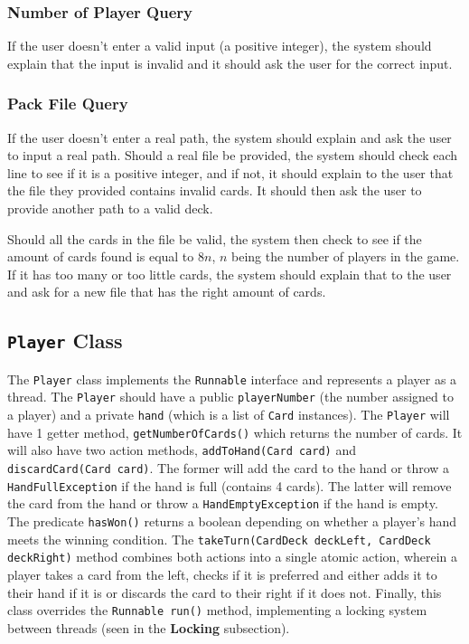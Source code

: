 \documentclass[a4paper, 11pt] {article}
\begin{document}
\subsubsection*{Number of Player Query}
If the user doesn't enter a valid input (a positive integer), the system should explain that the input is invalid and it should ask the user for the correct input.
\subsubsection*{Pack File Query}
If the user doesn't enter a real path, the system should explain and ask the user to input a real path.
Should a real file be provided, the system should check each line to see if it is a positive integer, and if not, it should explain to the user that the file they provided contains invalid cards. It should then ask the user to provide another path to a valid deck.

Should all the cards in the file be valid, the system then check to see if the amount of cards found is equal to $8n$, $n$ being the number of players in the game. If it has too many or too little cards, the system should explain that to the user and ask for a new file that has the right amount of cards.
\subsection*{\texttt{Player} Class}
The \texttt{Player} class implements the \texttt{Runnable} interface and represents a player as a thread. 
The \texttt{Player} should have a public \texttt{playerNumber} (the number assigned to a player) and a private \texttt{hand} (which is a list of \texttt{Card} instances). 
The \texttt{Player} will have 1 getter method, \texttt{getNumberOfCards()} which returns the number of cards. 
It will also have two action methods, \texttt{addToHand(Card card)} and \texttt{discardCard(Card card)}. The former will add the card to the hand or throw a \texttt{HandFullException} if the hand is full (contains 4 cards). The latter will remove the card from the hand or throw a \texttt{HandEmptyException} if the hand is empty. 
The predicate \texttt{hasWon()} returns a boolean depending on whether a player's hand meets the winning condition. 
The \texttt{takeTurn(CardDeck deckLeft, CardDeck deckRight)} method combines both actions into a single atomic action, wherein a player takes a card from the left, checks if it is preferred and either adds it to their hand if it is or discards the card to their right if it does not. 
Finally, this class overrides the \texttt{Runnable run()} method, implementing a locking system between threads (seen in the \textbf{Locking} subsection).
\end{document}
